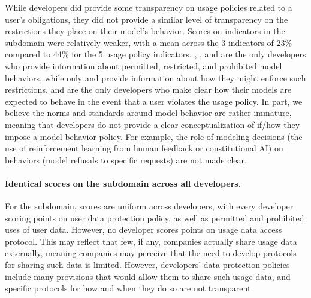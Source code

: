 \documentclass[screen, authorversion, acmsmall]{acmart}
\begin{document}
While developers did provide some transparency on usage policies related to a user's obligations, they did not provide a similar level of transparency on the restrictions they place on their model's behavior. 
Scores on indicators in the \modelbehaviorpolicy subdomain were relatively weaker, with a mean across the 3 indicators of 23\% compared to 44\% for the 5 usage policy indicators.
\openai, \anthropic, and \inflection are the only developers who provide information about permitted, restricted, and prohibited model behaviors, while only \inflection and \stability provide information about how they might enforce such restrictions.
\openai and \anthropic are the only developers who make clear how their models are expected to behave in the event that a user violates the usage policy. 
In part, we believe the norms and standards around model behavior are rather immature, meaning that developers do not provide a clear conceptualization of if/how they impose a model behavior policy.
For example, the role of modeling decisions (\eg the use of reinforcement learning from human feedback or constitutional AI) on behaviors (\eg model refusals to specific requests) are not made clear.

\paragraph{Identical scores on the \dataprotection subdomain across all developers.}
For the \dataprotection subdomain, scores are uniform across developers, with every developer scoring points on user data protection policy, as well as permitted and prohibited uses of user data.
However, no developer scores points on usage data access protocol. 
This may reflect that few, if any, companies actually share usage data externally, meaning companies may perceive that the need to develop protocols for sharing such data is limited. 
However, developers' data protection policies include many provisions that would allow them to share such usage data, and specific protocols for how and when they do so are not transparent.
\end{document}
